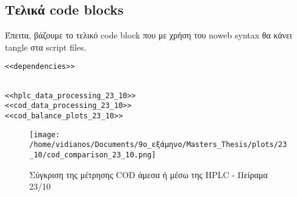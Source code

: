 \documentclass[11pt]{article}
\begin{document}
\subsection{Τελικά code blocks}
\label{sec:orgd8b475a}
Έπειτα, βάζουμε το τελικό code block που με χρήση του noweb syntax θα κάνει tangle στα script files.

\begin{verbatim}
<<dependencies>>
\end{verbatim}

\begin{verbatim}

<<hplc_data_processing_23_10>>
<<cod_data_processing_23_10>>
<<cod_balance_plots_23_10>>

\end{verbatim}

\begin{figure}[htbp]
\centering
\texttt{[image: /home/vidianos/Documents/9o\_εξάμηνο/Masters\_Thesis/plots/23\_10/cod\_comparison\_23\_10.png]}
\caption{Σύγκριση της μέτρησης COD άμεσα ή μέσω της HPLC - Πείραμα 23/10}
\end{figure}
\end{document}

